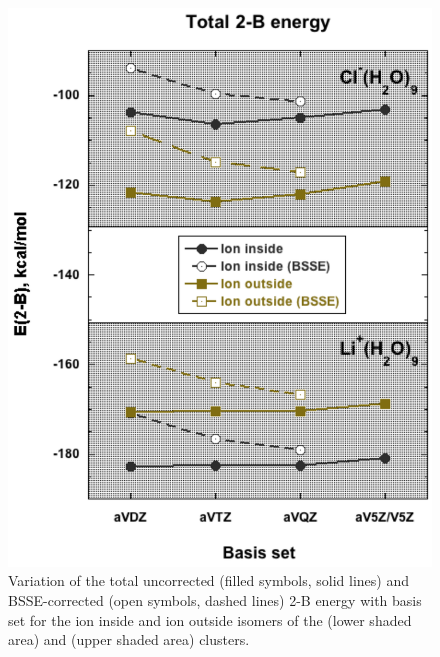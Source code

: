\begin{figure}[h]
\uwsinglespace
\centering
\includegraphics[width=.5\textwidth]{Figures/Chapter_3/figure_2.pdf}
\caption[Variation of the total uncorrected (filled symbols, solid lines) and BSSE-corrected (open symbols, dashed lines) 2-B energy with basis set for the ion inside and ion outside isomers of the  (lower shaded area) and  (upper shaded area) clusters.]{Variation of the total uncorrected (filled symbols, solid lines) and BSSE-corrected (open symbols, dashed lines) 2-B energy with basis set for the ion inside and ion outside isomers of the  (lower shaded area) and  (upper shaded area) clusters.}
\label{fig:MBE_II_2}
\end{figure}